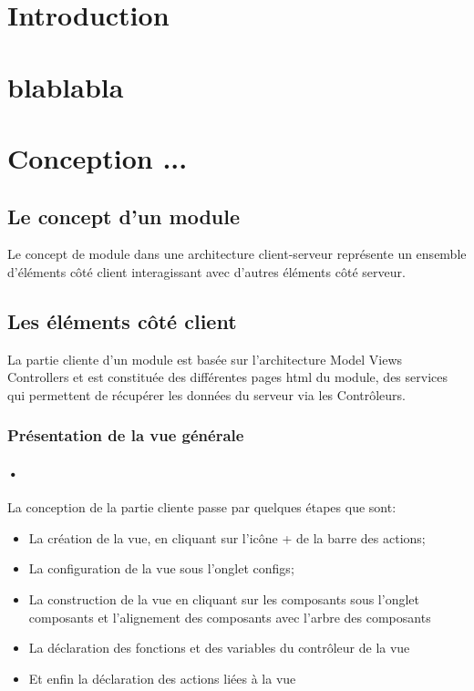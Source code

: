 \documentclass[a4paper,12pt]{article}
\begin{document}
\section{Introduction}

\section{blablabla}

\section{Conception ...}
\subsection{Le concept d'un module}

Le concept de module dans une architecture client-serveur représente un ensemble d'éléments côté client
interagissant avec d'autres éléments côté serveur.
\subsection{Les éléments côté client}
La partie cliente d’un module est basée sur l'architecture Model Views
Controllers et est constituée des différentes pages html du module,
des services qui permettent de récupérer les données du serveur via
les Contrôleurs.
\subsubsection{Présentation de la vue générale} %
\paragraph{•}
La conception de la partie cliente passe par quelques étapes que sont:
\begin{itemize}
\item La création de la vue, en cliquant sur l'icône + de la barre des actions;
\item La configuration de la vue sous l'onglet  configs;
\item La construction de la vue en cliquant sur les composants sous
  l'onglet composants et l'alignement des composants avec l'arbre des
  composants
\item La déclaration des fonctions et des variables du contrôleur de la vue
\item Et enfin la déclaration des actions liées à la vue

\end{itemize}
\end{document}
